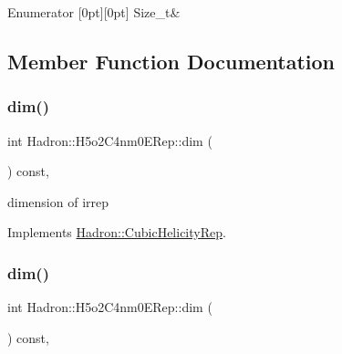 \begin{DoxyEnumFields}{Enumerator}
[0pt][0pt]{}\mbox{\label{structHadron_1_1H5o2C4nm0ERep_abc0153fc4d8f2aefe7fb7b904b451a60a0b1ece80ef632e4f9d702b65570c12ac}} 
Size\+\_\+t&\\
\hline

\end{DoxyEnumFields}


\subsection{Member Function Documentation}
\mbox{\label{structHadron_1_1H5o2C4nm0ERep_a0f02fe46b046e8aa23d25931a87505d6}} 
\subsubsection{\texorpdfstring{dim()}{dim()}\hspace{0.1cm}{\footnotesize\ttfamily [1/3]}}
{\footnotesize\ttfamily int Hadron\+::\+H5o2\+C4nm0\+E\+Rep\+::dim (\begin{DoxyParamCaption}{ }\end{DoxyParamCaption}) const\hspace{0.3cm}{\ttfamily [inline]}, {\ttfamily [virtual]}}

dimension of irrep 

Implements \mbox{\hyperlink{structHadron_1_1CubicHelicityRep_a95d229a05580e65f8bdde74a1e316855}{Hadron\+::\+Cubic\+Helicity\+Rep}}.

\mbox{\label{structHadron_1_1H5o2C4nm0ERep_a0f02fe46b046e8aa23d25931a87505d6}} 
\subsubsection{\texorpdfstring{dim()}{dim()}\hspace{0.1cm}{\footnotesize\ttfamily [2/3]}}
{\footnotesize\ttfamily int Hadron\+::\+H5o2\+C4nm0\+E\+Rep\+::dim (\begin{DoxyParamCaption}{ }\end{DoxyParamCaption}) const\hspace{0.3cm}{\ttfamily [inline]}, {\ttfamily [virtual]}}

